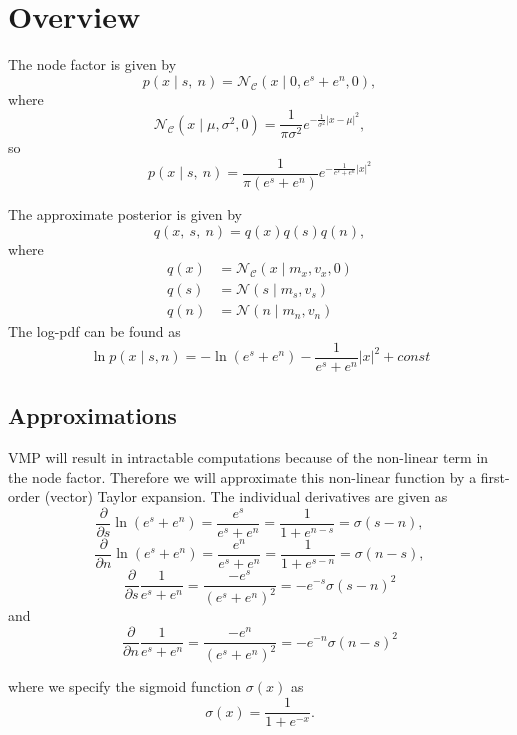 \section{Overview}
The node factor is given by
\begin{equation}
    p(x\mid s,\ n) = \mathcal{N}_\mathcal{C}(x\mid 0, e^s + e^n, 0),
\end{equation}
where
\begin{equation}
    \mathcal{N}_\mathcal{C}(x \mid \mu, \sigma^2, 0) = \frac{1}{\pi\sigma^2}e^{-\frac{1}{\sigma^2}|x-\mu|^2},
\end{equation}
so 
\begin{equation}
    p(x\mid s,\ n) = \frac{1}{\pi(e^s + e^n)}e^{-\frac{1}{e^s + e^n}|x|^2}
\end{equation}

The approximate posterior is given by
\begin{equation}
    q(x,\ s,\ n) = q(x) q(s) q(n),
\end{equation}
where 
\begin{align}
    q(x) &= \mathcal{N}_\mathcal{C}(x\mid m_x, v_x, 0) \\
    q(s) &= \mathcal{N}(s\mid m_s, v_s) \\
    q(n) &= \mathcal{N}(n\mid m_n, v_n)   
\end{align}
The log-pdf can be found as
\begin{equation}
    \ln p(x \mid s, n) = -\ln(e^s + e^n) -\frac{1}{e^s + e^n}|x|^2 + \textit{const}
\end{equation}

\subsection{Approximations}
VMP will result in intractable computations because of the non-linear term in the node factor. Therefore we will approximate this non-linear function by a first-order (vector) Taylor expansion. The individual derivatives are given as 
\begin{equation}
    \frac{\partial}{\partial s} \ln(e^{s} + e^{n}) = \frac{e^s}{e^s + e^n} = \frac{1}{1+e^{n-s}} = \sigma(s-n),
\end{equation}
\begin{equation}
    \frac{\partial}{\partial n} \ln(e^{s} + e^{n}) = \frac{e^n}{e^s + e^n} = \frac{1}{1+e^{s-n}} = \sigma(n-s),
\end{equation}
\begin{equation}
    \frac{\partial}{\partial s} \frac{1}{e^s + e^n} = \frac{-e^s}{(e^s + e^n)^2} =-e^{-s}\sigma(s-n)^2
\end{equation}
and 
\begin{equation}
    \frac{\partial}{\partial n} \frac{1}{e^s + e^n} = \frac{-e^n}{(e^s + e^n)^2} =-e^{-n}\sigma(n-s)^2
\end{equation}

where we specify the sigmoid function $\sigma(x)$ as 
\begin{equation}
    \sigma(x)  = \frac{1}{1+ e^{-x}}.
\end{equation}